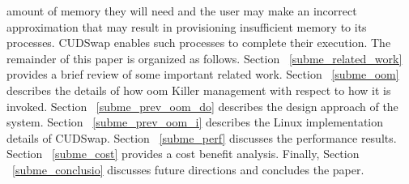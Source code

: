 amount of memory they will need and the user may make an incorrect approximation that may
result in provisioning insufficient memory to its processes. CUDSwap enables such
processes to complete their execution. The remainder of this paper is organized as follows.
Section ~\ref{subme_related_work} provides a brief review of some important related work.
Section ~\ref{subme_oom} describes the details of how \gls{oom} Killer management
with respect to how it is invoked. Section ~\ref{subme_prev_oom_do} describes the
design approach of the system. Section ~\ref{subme_prev_oom_i} describes the
Linux implementation details of CUDSwap. Section ~\ref{subme_perf} discusses the
performance results. Section ~\ref{subme_cost} provides a cost benefit analysis.
Finally, Section ~\ref{subme_conclusio} discusses future directions and concludes the paper.

